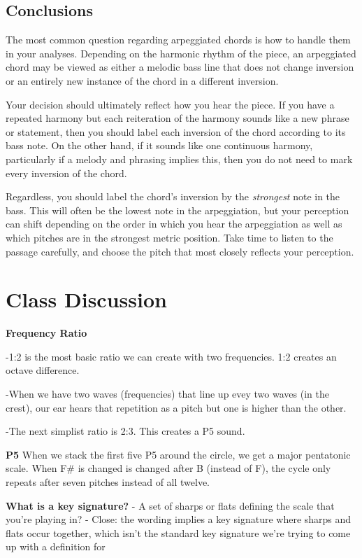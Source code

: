 \documentclass{book}
\begin{document}
\hypertarget{conclusions-70}{%
\subsection{Conclusions}\label{conclusions-70}}

The most common question regarding arpeggiated chords is how to handle them in
your analyses. Depending on the harmonic rhythm of the piece, an arpeggiated
chord may be viewed as either a melodic bass line that does not change
inversion or an entirely new instance of the chord in a different inversion.

Your decision should ultimately reflect how you hear the piece. If you have a
repeated harmony but each reiteration of the harmony sounds like a new phrase
or statement, then you should label each inversion of the chord according to
its bass note. On the other hand, if it sounds like one continuous harmony,
particularly if a melody and phrasing implies this, then you do not need to
mark every inversion of the chord.

Regardless, you should label the chord's inversion by the \emph{strongest}
note in the bass. This will often be the lowest note in the arpeggiation, but
your perception can shift depending on the order in which you hear the
arpeggiation as well as which pitches are in the strongest metric position.
Take time to listen to the passage carefully, and choose the pitch that most
closely reflects your perception.

\hypertarget{class-discussion-58}{%
\section{Class Discussion}\label{class-discussion-58}}

\textbf{Frequency Ratio}

-1:2 is the most basic ratio we can create with two frequencies. 1:2 creates
an octave difference.

-When we have two waves (frequencies) that line up evey two waves (in the
crest), our ear hears that repetition as a pitch but one is higher than the
other.

-The next simplist ratio is 2:3. This creates a P5 sound.

\textbf{P5} When we stack the first five P5 around the circle, we get a major
pentatonic scale. When F\# is changed is changed after B (instead of F), the
cycle only repeats after seven pitches instead of all twelve.

\textbf{What is a key signature?} - A set of sharps or flats defining the
scale that you're playing in? - Close: the wording implies a key signature
where sharps and flats occur together, which isn't the standard key signature
we're trying to come up with a definition for
\end{document}

